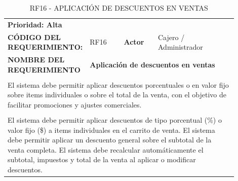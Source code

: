 \begingroup
\renewcommand{\arraystretch}{1.3}
\setlength{\tabcolsep}{6pt}
\centering
\begin{longtable}{|p{0.25\linewidth}|p{0.15\linewidth}|p{0.15\linewidth}|p{0.35\linewidth}|}
\caption{RF16 - APLICACIÓN DE DESCUENTOS EN VENTAS}\label{tab:rf16}\\
\hline
		\rowcolor{tableheaderblue}
		\multicolumn{4}{|l|}{\textbf{Requerimientos funcionales}}                                                                                                                                           \\ \hline
		\multicolumn{4}{|l|}{\textbf{Prioridad: Alta}}                                                                                                                                                      \\ \hline
		\textbf{CÓDIGO DEL REQUERIMIENTO:}                          & RF16                                                             & \cellcolor{tableheaderblue}\textbf{Actor} & Cajero / Administrador \\ \hline
		\textbf{NOMBRE DEL REQUERIMIENTO}                           & \multicolumn{3}{l|}{\textbf{Aplicación de descuentos en ventas}}                                                                      \\ \hline
		\rowcolor{tableheaderblue}
		\multicolumn{4}{|l|}{\textbf{Descripción}}                                                                                                                                                          \\ \hline
		\multicolumn{4}{|p{0.96\linewidth}|}{%
		El sistema debe permitir aplicar descuentos porcentuales o en valor fijo sobre items individuales o sobre el total de la venta, con el objetivo de facilitar promociones y ajustes comerciales.}    \\ \hline
		\rowcolor{tableheaderblue}
		\multicolumn{4}{|l|}{\textbf{Funcionalidad}}                                                                                                                                                        \\ \hline
		\multicolumn{4}{|p{0.96\linewidth}|}{%
		El sistema debe permitir aplicar descuentos de tipo porcentual (\%) o valor fijo (\$) a items individuales en el carrito de venta. \newline
		El sistema debe permitir aplicar un descuento general sobre el subtotal de la venta completa. \newline
		El sistema debe recalcular automáticamente el subtotal, impuestos y total de la venta al aplicar o modificar descuentos. \newline
}
\end{longtable}
